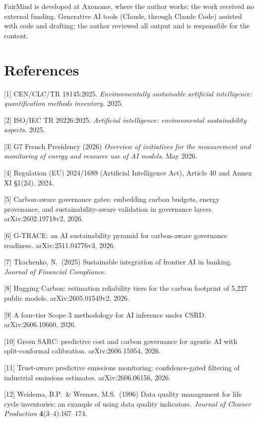 \documentclass{article}
\begin{document}
\begin{ack}
FairMind is developed at Axonome, where the author works; the work received
no external funding. Generative AI tools (Claude, through Claude Code) assisted
with code and drafting; the author reviewed all output and is responsible for
the content.
\end{ack}

\section*{References}

\small

[1] CEN/CLC/TR 18145:2025. {\it Environmentally sustainable artificial
intelligence: quantification methods inventory.} 2025.

[2] ISO/IEC TR 20226:2025. {\it Artificial intelligence: environmental
sustainability aspects.} 2025.

[3] G7 French Presidency (2026) {\it Overview of initiatives for the
measurement and monitoring of energy and resource use of AI models.} May 2026.

[4] Regulation (EU) 2024/1689 (Artificial Intelligence Act), Article 40 and
Annex XI \S1(2d). 2024.

[5] Carbon-aware governance gates: embedding carbon budgets, energy provenance,
and sustainability-aware validation in governance layers. arXiv:2602.19718v2,
2026.

[6] G-TRACE: an AI sustainability pyramid for carbon-aware governance
readiness. arXiv:2511.04776v3, 2026.

[7] Tkachenko, N.\ (2025) Sustainable integration of frontier AI in banking.
{\it Journal of Financial Compliance.}

[8] Hugging Carbon: estimation reliability tiers for the carbon footprint of
5{,}227 public models. arXiv:2605.01549v2, 2026.

[9] A four-tier Scope 3 methodology for AI inference under CSRD.
arXiv:2606.10660, 2026.

[10] Green SARC: predictive cost and carbon governance for agentic AI with
split-conformal calibration. arXiv:2606.15954, 2026.

[11] Trust-aware predictive emissions monitoring: confidence-gated filtering of
industrial emissions estimates. arXiv:2606.06156, 2026.

[12] Weidema, B.P.\ \& Wesn\ae s, M.S.\ (1996) Data quality management for life
cycle inventories: an example of using data quality indicators. {\it Journal of
Cleaner Production} {\bf 4}(3--4):167--174.
\end{document}
